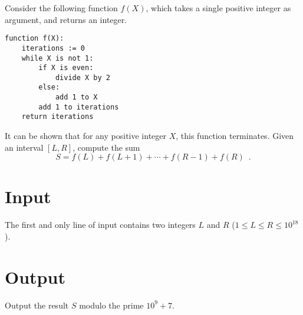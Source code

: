 Consider the following function $f(X)$, which takes a single positive integer as argument, and returns an integer.
\begin{verbatim}
function f(X):
    iterations := 0
    while X is not 1:
        if X is even:
            divide X by 2
        else:
            add 1 to X
        add 1 to iterations
    return iterations
\end{verbatim}
\noindent
It can be shown that for any positive integer $X$, this function terminates.
Given an interval $[L, R]$, compute the sum
\[S = f(L) + f(L+1) + \cdots + f(R-1) + f(R)\enspace.\]

\section*{Input}
The first and only line of input contains two integers $L$ and $R$
($1 \leq L \leq R \leq 10^{18}$).

\section*{Output}
Output the result $S$ modulo the prime $10^9+7$.

